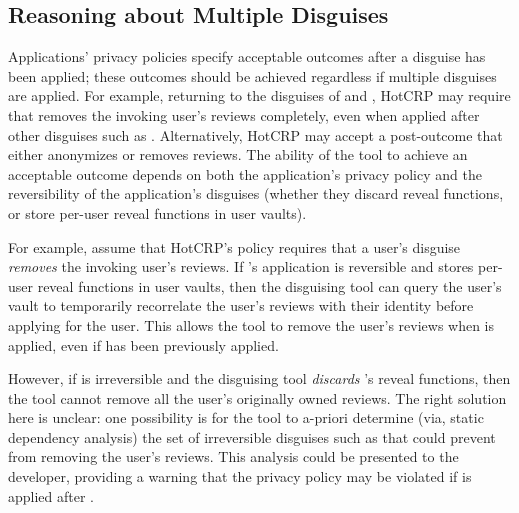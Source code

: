 \subsection{Reasoning about Multiple Disguises}
\label{sec:composition}
Applications' privacy policies specify acceptable outcomes after a disguise has been applied; these
outcomes should be achieved regardless if multiple disguises are applied.  For example, returning to
the disguises of \gdpr and \ca, HotCRP may require that \gdpr removes the invoking user's reviews
completely, even when applied after other disguises such as \ca.  Alternatively, HotCRP may accept a
post-\gdpr outcome that either anonymizes or removes reviews.  The ability of the tool to achieve an
acceptable outcome depends on both the application's privacy policy and the reversibility of the
application's disguises (\ie whether they discard reveal functions, or store per-user reveal
functions in user vaults).

For example, assume that HotCRP's policy requires that a user's \gdpr disguise \emph{removes} the
invoking user's reviews. If \ca's application is reversible and stores per-user reveal functions in
user vaults, then the disguising tool can query the user's vault to temporarily recorrelate the
user's reviews with their identity before applying \gdpr for the user. This allows the tool to
remove the user's reviews when \gdpr is applied, even if \ca has been previously applied.
%

However, if \ca is irreversible and the disguising tool \emph{discards} \ca's reveal functions, then
the tool cannot remove all the user's originally owned reviews.  The right solution here is unclear:
one possibility is for the tool to a-priori determine (via, \eg static dependency analysis) the set
of irreversible disguises such as \ca that could prevent \gdpr from removing the user's reviews.
This analysis could be presented to the developer, providing a warning that the privacy policy may
be violated if \gdpr is applied after \ca.

